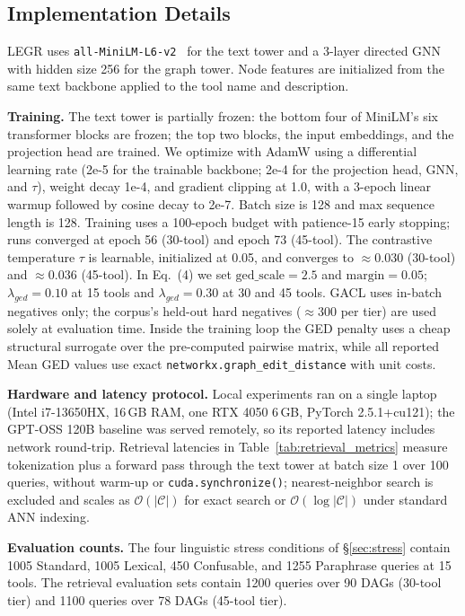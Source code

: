 \documentclass{article}
\begin{document}
\subsection{Implementation Details}
\label{sec:impl}
LEGR uses \texttt{all-MiniLM-L6-v2}~\cite{wang2020minilm,reimers-gurevych-2019-sentence} for the text tower and a 3-layer directed GNN with hidden size 256 for the graph tower. Node features are initialized from the same text backbone applied to the tool name and description.

\textbf{Training.} The text tower is partially frozen: the bottom four of MiniLM's six transformer blocks are frozen; the top two blocks, the input embeddings, and the projection head are trained. We optimize with AdamW using a differential learning rate (2e-5 for the trainable backbone; 2e-4 for the projection head, GNN, and $\tau$), weight decay 1e-4, and gradient clipping at 1.0, with a 3-epoch linear warmup followed by cosine decay to 2e-7. Batch size is 128 and max sequence length is 128. Training uses a 100-epoch budget with patience-15 early stopping; runs converged at epoch 56 (30-tool) and epoch 73 (45-tool). The contrastive temperature $\tau$ is learnable, initialized at 0.05, and converges to $\approx 0.030$ (30-tool) and $\approx 0.036$ (45-tool). In Eq.~(4) we set $\text{ged\_scale}=2.5$ and $\text{margin}=0.05$; $\lambda_{ged}=0.10$ at 15 tools and $\lambda_{ged}=0.30$ at 30 and 45 tools. GACL uses in-batch negatives only; the corpus's held-out hard negatives ($\approx 300$ per tier) are used solely at evaluation time. Inside the training loop the GED penalty uses a cheap structural surrogate over the pre-computed pairwise matrix, while all reported Mean GED values use exact \texttt{networkx.graph\_edit\_distance} with unit costs.

\textbf{Hardware and latency protocol.} Local experiments ran on a single laptop (Intel i7-13650HX, 16\,GB RAM, one RTX 4050 6\,GB, PyTorch 2.5.1+cu121); the GPT-OSS 120B baseline was served remotely, so its reported latency includes network round-trip. Retrieval latencies in Table~\ref{tab:retrieval_metrics} measure tokenization plus a forward pass through the text tower at batch size 1 over 100 queries, without warm-up or \texttt{cuda.synchronize()}; nearest-neighbor search is excluded and scales as $\mathcal{O}(|\mathcal{C}|)$ for exact search or $\mathcal{O}(\log|\mathcal{C}|)$ under standard ANN indexing.

\textbf{Evaluation counts.} The four linguistic stress conditions of \S\ref{sec:stress} contain 1005 Standard, 1005 Lexical, 450 Confusable, and 1255 Paraphrase queries at 15 tools. The retrieval evaluation sets contain 1200 queries over 90 DAGs (30-tool tier) and 1100 queries over 78 DAGs (45-tool tier).
\end{document}
